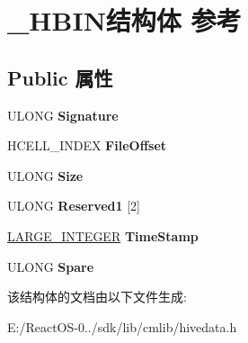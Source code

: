 \hypertarget{struct___h_b_i_n}{}\section{\+\_\+\+H\+B\+I\+N结构体 参考}
\label{struct___h_b_i_n}
\subsection*{Public 属性}
\begin{DoxyCompactItemize}
\item 
\mbox{\label{struct___h_b_i_n_a6785d0922181a0456f85a85b7d9dfddc}} 
U\+L\+O\+NG {\bfseries Signature}
\item 
\mbox{\label{struct___h_b_i_n_a1ba6883a4d6b587d28c950a64b7612b3}} 
H\+C\+E\+L\+L\+\_\+\+I\+N\+D\+EX {\bfseries File\+Offset}
\item 
\mbox{\label{struct___h_b_i_n_a9d520b10547653f44a6f8c144c284704}} 
U\+L\+O\+NG {\bfseries Size}
\item 
\mbox{\label{struct___h_b_i_n_a51d349f8f10ed75676a91211ac54a15b}} 
U\+L\+O\+NG {\bfseries Reserved1} \mbox{[}2\mbox{]}
\item 
\mbox{\label{struct___h_b_i_n_a3ae500882bd1462ffa523dc792097c91}} 
\hyperlink{union___l_a_r_g_e___i_n_t_e_g_e_r}{L\+A\+R\+G\+E\+\_\+\+I\+N\+T\+E\+G\+ER} {\bfseries Time\+Stamp}
\item 
\mbox{\label{struct___h_b_i_n_a0db03a98a9d752d38323aaa1fbe2ff5c}} 
U\+L\+O\+NG {\bfseries Spare}
\end{DoxyCompactItemize}


该结构体的文档由以下文件生成\+:\begin{DoxyCompactItemize}
\item 
E\+:/\+React\+O\+S-\/0../sdk/lib/cmlib/hivedata.\+h\end{DoxyCompactItemize}
